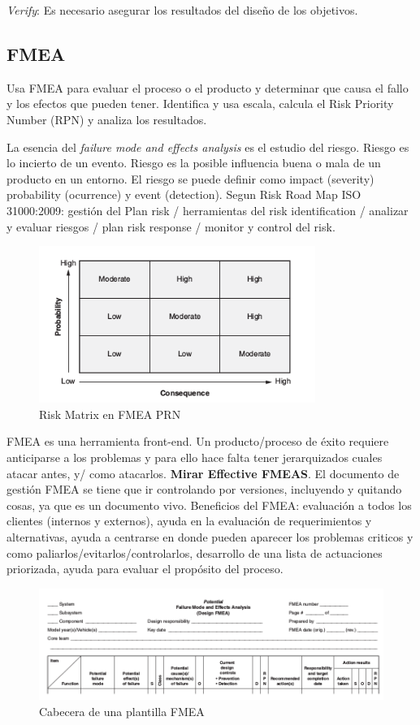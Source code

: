 \documentclass[]{article}
\begin{document}
\textit{Verify}: Es necesario asegurar los resultados del diseño de los objetivos. 

\subsection{FMEA} Usa FMEA para evaluar el proceso o el producto y determinar que causa el fallo y los efectos que pueden tener. 
Identifica y usa escala, calcula el Risk Priority Number (RPN) y analiza los resultados.

La esencia del \textit{failure mode and effects analysis} es el estudio del riesgo. Riesgo es lo incierto de un evento. Riesgo es la posible influencia buena o mala de un producto en un entorno. El riesgo se puede definir como impact (severity)  probability (ocurrence) y event (detection). Segun Risk Road Map ISO 31000:2009: gestión del Plan risk / herramientas del risk identification / analizar y evaluar riesgos / plan risk response / monitor y control del risk.

\begin{figure}[ht!]
	\centering
	\includegraphics[width=90mm]{imagenes/RiskMatrix.png}
	\caption{Risk Matrix en FMEA PRN}
	\label{fig:kMatrix}
\end{figure}

FMEA es una herramienta front-end. Un producto/proceso de éxito requiere anticiparse a los problemas y para ello hace falta tener jerarquizados cuales atacar antes, y/ como atacarlos. \textbf{Mirar Effective FMEAS}. El documento de gestión FMEA se tiene que ir controlando por versiones, incluyendo y quitando cosas, ya que es un documento vivo. Beneficios del FMEA: evaluación a todos los clientes (internos y externos), ayuda en la evaluación de requerimientos y alternativas, ayuda a centrarse en donde pueden aparecer los problemas criticos y como paliarlos/evitarlos/controlarlos, desarrollo de una lista de actuaciones priorizada, ayuda para evaluar el propósito del proceso.

\begin{figure}[ht!]
	\centering
	\includegraphics[width=170mm]{imagenes/PlantillaFMEA.png}
	\caption{Cabecera de una plantilla FMEA}
	\label{fig:PlantillaFMEA}
\end{figure}
\end{document}
